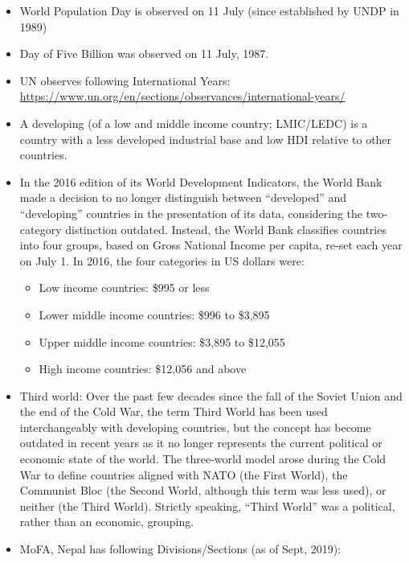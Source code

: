 \documentclass[
  openany]{book}
\providecommand{\tightlist}{%
  \setlength{\itemsep}{0pt}\setlength{\parskip}{0pt}}
\begin{document}
\begin{itemize}
\tightlist
\item
  World Population Day is observed on 11 July (since established by UNDP in 1989)
\item
  Day of Five Billion was observed on 11 July, 1987.
\item
  UN observes following International Years: \url{https://www.un.org/en/sections/observances/international-years/}
\item
  A developing (of a low and middle income country; LMIC/LEDC) is a country with a less developed industrial base and low HDI relative to other countries.
\item
  In the 2016 edition of its World Development Indicators, the World Bank made a decision to no longer distinguish between ``developed'' and ``developing'' countries in the presentation of its data, considering the two-category distinction outdated. Instead, the World Bank classifies countries into four groups, based on Gross National Income per capita, re-set each year on July 1. In 2016, the four categories in US dollars were:

  \begin{itemize}
  \tightlist
  \item
    Low income countries: \$995 or less
  \item
    Lower middle income countries: \$996 to \$3,895
  \item
    Upper middle income countries: \$3,895 to \$12,055
  \item
    High income countries: \$12,056 and above
  \end{itemize}
\item
  Third world:
  Over the past few decades since the fall of the Soviet Union and the end of the Cold War, the term Third World has been used interchangeably with developing countries, but the concept has become outdated in recent years as it no longer represents the current political or economic state of the world. The three-world model arose during the Cold War to define countries aligned with NATO (the First World), the Communist Bloc (the Second World, although this term was less used), or neither (the Third World). Strictly speaking, ``Third World'' was a political, rather than an economic, grouping.
\item
  MoFA, Nepal has following Divisions/Sections (as of Sept, 2019):


\end{itemize}
\end{document}
